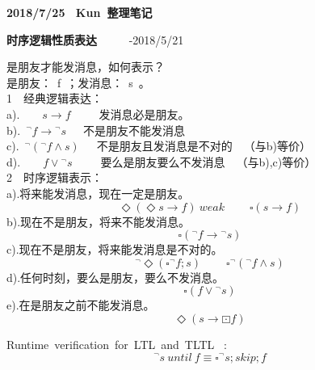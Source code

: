 \newpage
\textbf{2018/7/25 ~Kun~整理笔记}
\begin{center}
\textbf{时序逻辑性质表达 }~~~~~-2018/5/21
\end{center}
是朋友才能发消息，如何表示？\\
是朋友：~f~；发消息：~s~。\\

\noindent\textcircled{\footnotesize{1}}~~经典逻辑表达：\\
a).~~~~$s\rightarrow f$~~~~~发消息必是朋友。\\
b).~${^\lnot} f\rightarrow {^\lnot}s$~~~不是朋友不能发消息\\
c).~${^\lnot} ( {^\lnot} f\wedge s )$~~~不是朋友且发消息是不对的~~（与b)等价）\\
d).~~~~$f\vee {^\lnot s}$~~~~~要么是朋友要么不发消息~~（与b),c)等价）\\



\noindent\textcircled{\footnotesize{2}}~~时序逻辑表示：\\
a).将来能发消息，现在一定是朋友。
$$\Diamond(\Diamond s \rightarrow f) ~weak~~~~~~~~~~\square(s\rightarrow f)$$
b).现在不是朋友，将来不能发消息。
$$\square({^\lnot} f \rightarrow{^\lnot} s)$$
c).现在不是朋友，将来能发消息是不对的。
$${^\lnot}\Diamond(\square{^\lnot}f;s)~~~~~~~~~~\square{^\lnot({^\lnot} f\wedge s)}$$
d).任何时刻，要么是朋友，要么不发消息。
$$\square(f\vee{^\lnot}s)$$
e).在是朋友之前不能发消息。
$$\Diamond(s\rightarrow\boxdot f)$$


\noindent Runtime~verification~for~LTL~and~TLTL ~:\\
$${^\lnot}s~until~f\equiv \square {^\lnot}s;skip;f$$
